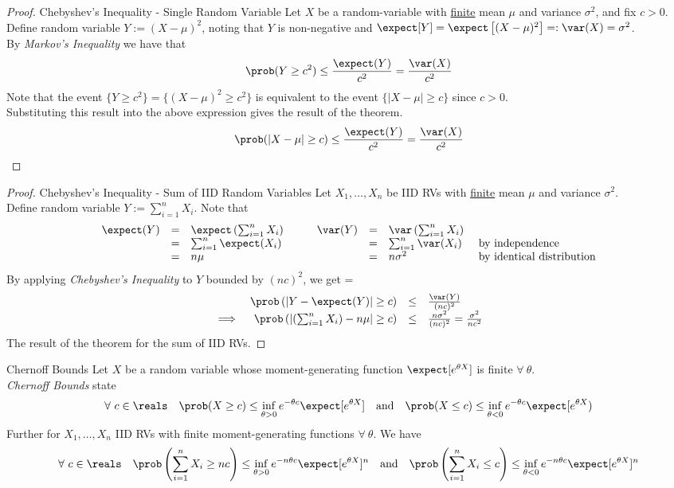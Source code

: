 \documentclass[11pt,a4paper]{article}
\begin{document}
  \begin{proof}{Chebyshev's Inequality - Single Random Variable}
    Let $X$ be a random-variable with \underline{finite} mean $\mu$ and variance $\sigma^2$, and fix $c>0$.\\
    Define random variable $Y:=(X-\mu)^2$, noting that $Y$ is non-negative and $\expect[Y]=\expect\left[(X-\mu)^2\right]=:\var(X)=\sigma^2$.\\
    By \textit{Markov's Inequality} we have that
    \[ \prob(Y\geq c^2)\leq\frac{\expect(Y)}{c^2}=\frac{\var(X)}{c^2} \]
    Note that the event $\{Y\geq c^2\}=\{(X-\mu)^2\geq c^2\}$ is equivalent to the event $\{|X-\mu|\geq c\}$ since $c>0$.\\
    Substituting this result into the above expression gives the result of the theorem.
    \[ \prob(|X-\mu|\geq c)\leq\frac{\expect(Y)}{c^2}=\frac{\var(X)}{c^2} \]
    \proved
  \end{proof}

  \begin{proof}{Chebyshev's Inequality - Sum of IID Random Variables}
    Let $X_1,\dots,X_n$ be IID RVs with \underline{finite} mean $\mu$ and variance $\sigma^2$.\\
    Define random variable $Y:=\sum_{i=1}^nX_i$. Note that
    \[\begin{array}{rclcrcll}
      \expect(Y)&=&\expect\left(\sum_{i=1}^nX_i\right)&\quad&\var(Y)&=&\var\left(\sum_{i=1}^nX_i\right)\\
      &=&\sum_{i=1}^n\expect(X_i)&&&=&\sum_{i=1}^n\var(X_i)&\text{ by independence}\\
      &=&n\mu&&&=&n\sigma^2&\text{ by identical distribution}
    \end{array}\]
    By applying \textit{Chebyshev's Inequality} to $Y$ bounded by $(nc)^2$, we get
    \everymath={\displaystyle}
    \[\begin{array}{rrcl}
    &\prob\left(\left|Y-\expect(Y)\right|\geq c\right)&\leq&\frac{\var(Y)}{(nc)^2}\\
    \implies&\prob\left(\left|\left(\sum_{i=1}^nX_i\right)-n\mu\right|\geq c\right)&\leq&\frac{n\sigma^2}{(nc)^2}=\frac{\sigma^2}{nc^2}
    \end{array}\]
    The result of the theorem for the sum of IID RVs.\proved
  \end{proof}

  \begin{theorem}{Chernoff Bounds}
    Let $X$ be a random variable whose moment-generating function $\expect[e^{\theta X}]$ is finite $\forall\ \theta$.\\
    \textit{Chernoff Bounds} state
    \[ \forall\ c\in\reals\quad\prob(X\geq c)\leq\inf_{\theta>0}e^{-\theta c}\expect[e^{\theta X}]\quad\text{and}\quad\prob(X\leq c)\leq\inf_{\theta<0}e^{-\theta c}\expect[e^{\theta X}) \]
    Further for $X_1,\dots,X_n$ IID RVs with finite moment-generating functions $\forall\ \theta$. We have
    \[ \forall\ c\in\reals\quad\prob\left(\sum_{i=1}^nX_i\geq nc\right)\leq\inf_{\theta>0}e^{-n\theta c}\expect[e^{\theta X}]^n\quad\text{and}\quad\prob\left(\sum_{i=1}^nX_i\leq c\right)\leq\inf_{\theta<0}e^{-n\theta c}\expect[e^{\theta X}]^n \]
  \end{theorem}
\end{document}
